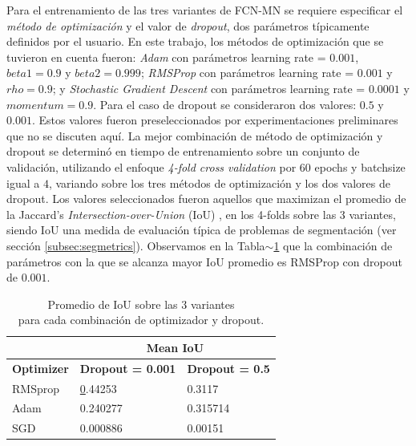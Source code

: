 \documentclass[a4paper,authoryear,review]{elsarticle}
\begin{document}
%
Para el entrenamiento de las tres variantes de FCN-MN se requiere especificar el \emph{método de optimización} y el valor de \emph{dropout}, dos parámetros típicamente definidos por el usuario. En este trabajo, los métodos de optimización que se tuvieron en cuenta fueron: \emph{Adam} con parámetros learning rate = $0.001$, $beta1 = 0.9$ y $beta2 = 0.999$; \emph{RMSProp} con parámetros learning rate = $0.001$ y $rho = 0.9$; y \emph{Stochastic Gradient Descent} con parámetros learning rate = $0.0001$ y $momentum = 0.9$. Para el caso de dropout se consideraron dos valores: $0.5$ y $0.001$. Estos valores fueron preseleccionados por experimentaciones preliminares que no se discuten aquí.
%
La mejor combinación de método de optimización y dropout se determinó en tiempo de entrenamiento sobre un conjunto de validación, utilizando el enfoque \emph{4-fold cross validation} por 60 epochs y batchsize igual a $4$, variando sobre los tres métodos de optimización y los dos valores de dropout. Los valores seleccionados fueron aquellos que maximizan el promedio de la Jaccard’s \emph{Intersection-over-Union} (IoU) \citep{jaccard1912distribution},  en los 4-folds sobre las 3 variantes, siendo IoU una medida de evaluación típica de problemas de segmentación (ver sección \ref{subsec:segmetrics}). Observamos en la Tabla$\sim$\ref{tab:TablaX} que la combinación de parámetros con la que se alcanza mayor IoU promedio es RMSProp con dropout de $0.001$. 

\begin{table}[]
    \centering
        \begin{tabular}{lll}
            \hline
            \multicolumn{1}{|l|}{} & \multicolumn{2}{c|}{\textbf{Mean IoU}} \\ \hline
            \multicolumn{1}{|c|}{\textbf{Optimizer}} & \multicolumn{1}{c|}{\textbf{Dropout = 0.001}} & \multicolumn{1}{c|}{\textbf{Dropout = 0.5}} \\ \hline
            RMSprop & {\ul 0.44253} & 0.3117 \\
            Adam & 0.240277 & 0.315714 \\
            SGD & 0.000886 & 0.00151 \\ \hline
    \end{tabular}%
    \caption{Promedio de IoU sobre las $3$ variantes \\
        para cada combinación de optimizador y dropout.}
    \label{tab:TablaX}
\end{table}
\end{document}
